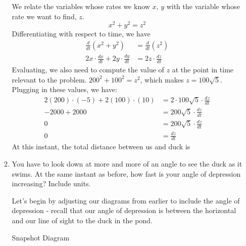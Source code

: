 \documentclass{article}
\begin{document}
\begin{enumerate}
\begin{enumerate}
\begin{solution}
        We relate the variables whose rates we know $x, \, y$ with the variable whose rate we want to find, $z$.
        $$x^2+y^2=z^2$$
        Differentiating with respect to time, we have
        \begin{align*}
            \frac{d}{dt}(x^2+y^2)&= \frac{d}{dt}(z^2)\\
            2x\cdot \frac{dx}{dt}+2y\cdot \frac{dy}{dt} &= 2z\cdot \frac{dz}{dt}
        \end{align*}
        Evaluating, we also need to compute the value of $z$ at the point in time relevant to the problem. $200^2+100^2=z^2$, which makes $z=100\sqrt{5}$. Plugging in these values, we have:
        \begin{align*}
        2(200)\cdot (-5)+2(100)\cdot (10) &= 2\cdot 100\sqrt{5}\cdot \frac{dz}{dt}\\
        -2000+2000&=200\sqrt{5}\cdot\frac{dz}{dt}\\
        0&=200\sqrt{5} \cdot \frac{dz}{dt}\\
        0&=\frac{dz}{dt}
        \end{align*}
        At this instant, the total distance between us and duck is 
    \end{solution}
  \item 
\begin{problem} 
  You have to look down at more and
    more of an angle to see the duck as it swims. At the same instant as before, how fast is your angle of depression
    increasing?
    Include units.
\end{problem}
\pspace{\vfill}

\begin{solution}
    Let's begin by adjusting our diagrams from earlier to include the angle of depression - recall that our angle of depression is between the horizontal and our line of sight to the duck in the pond.\\
     \begin{multicols}{2}
Snapshot Diagram\\
\end{multicols}
\end{solution}
\end{enumerate}
\end{enumerate}
\end{document}

